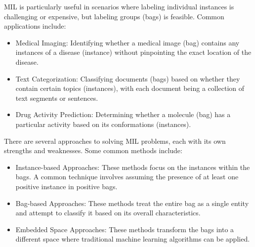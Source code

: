 \documentclass[
11pt, %
english, %
singlespacing, %
headsepline, %
]{project_structure}
\begin{document}
\noindent \acrshort{MIL} is particularly useful in scenarios where labeling individual instances is challenging or expensive, but labeling groups (bags) is feasible. Common applications include:

\begin{itemize}
    \item Medical Imaging: Identifying whether a medical image (bag) contains any instances of a disease (instance) without pinpointing the exact location of the disease.
    \item Text Categorization: Classifying documents (bags) based on whether they contain certain topics (instances), with each document being a collection of text segments or sentences.
    \item Drug Activity Prediction: Determining whether a molecule (bag) has a particular activity based on its conformations (instances).
\end{itemize}

\noindent There are several approaches to solving \acrshort{MIL} problems, each with its own strengths and weaknesses. Some common methods include:

\begin{itemize}
  \item Instance-based Approaches: These methods focus on the instances within the bags. A common technique involves assuming the presence of at least one positive instance in positive bags.
    \item Bag-based Approaches: These methods treat the entire bag as a single entity and attempt to classify it based on its overall characteristics.
  \item Embedded Space Approaches: These methods transform the bags into a different space where traditional machine learning algorithms can be applied.
\end{itemize}

\newpage
\end{document}
